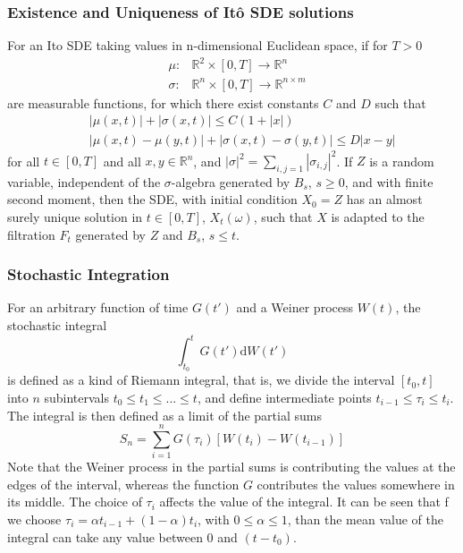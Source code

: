 \documentclass[12pt]{report}
\begin{document}
\subsubsection{Existence and Uniqueness of It\^{o} SDE solutions}
For an Ito SDE taking values in n-dimensional Euclidean space, if for $T>0$\\
\begin{eqnarray*}
&\mu:&\mathbb{R}^2\times[0,T]\rightarrow \mathbb{R}^n\\
&\sigma:&\mathbb{R}^n \times[0,T] \rightarrow \mathbb{R}^{n\times m}
\end{eqnarray*}
are measurable functions, for which there exist constants $C$ and $D$ such that 
\begin{eqnarray*}
&&|\mu(x,t)|+|\sigma(x,t)|\leq C(1+|x|)\\
&&|\mu(x,t)-\mu(y,t)|+|\sigma(x,t)-\sigma(y,t)|\leq D|x-y|
\end{eqnarray*}
for all $t\in [0,T]$ and all $x,y\in \mathbb{R}^n$, and $|\sigma|^2=\sum_{i,j=1}|\sigma_{i,j}|^2$. 
If $Z$ is a random variable, independent of the $\sigma$-algebra generated by $B_s$, $s\geq 0$, and with finite second moment, then the SDE, with initial condition $X_0=Z$ has an almost surely unique solution in $t\in[0,T]$, $X_t(\omega)$, such that $X$ is adapted to the filtration $F_t$ generated by $Z$ and $B_s$, $s\leq t$.


\subsubsection{Stochastic Integration}
For an arbitrary function of time $G(t')$ and a Weiner process $W(t)$, the stochastic integral 
\begin{equation*}
\int_{t_0}^t G(t')\mathrm{d}W(t')
\end{equation*}
is defined as a kind of Riemann integral, that is, we divide the interval $[t_0,t]$ into $n$ subintervals $t_0\leq t_1\leq ...\leq t$, and define intermediate points $t_{i-1}\leq\tau_i\leq t_{i}$. The integral is then defined as a limit of the partial sums 
\begin{equation*}
S_n=\sum_{i=1}^nG(\tau_i)[W(t_i)-W(t_{i-1})]
\end{equation*}
Note that the Weiner process in the partial sums is contributing the values at the edges of the interval, whereas the function $G$ contributes the values somewhere in its middle.
The choice of $\tau_i$ affects the value of the integral. It can be seen that f we choose $\tau_i=\alpha t_{i-1}+(1-\alpha)t_i$, with $0\leq \alpha\leq 1$,  than the mean value of the integral can take any value between 0 and $(t-t_0)$. 
\end{document}
